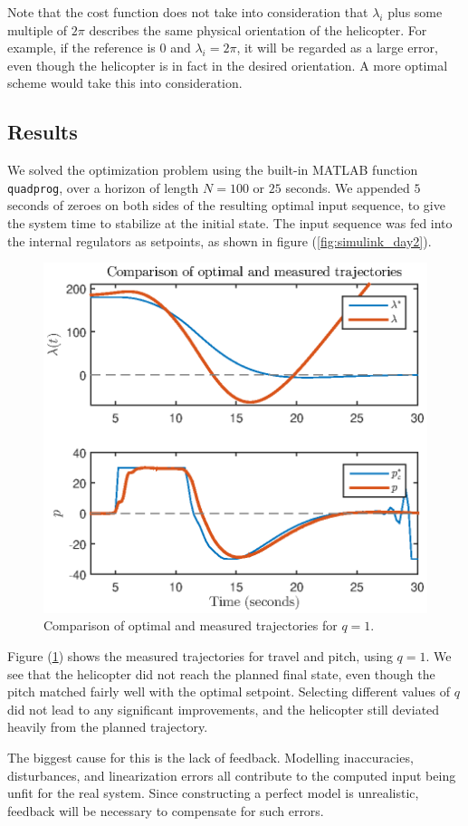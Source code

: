 Note that the cost function does not take into consideration that $\lambda_i$ plus some multiple of $2\pi$ describes the same physical orientation of the helicopter. For example, if the reference is $0$ and $\lambda_i = 2\pi$, it will be regarded as a large error, even though the helicopter is in fact in the desired orientation. A more optimal scheme would take this into consideration.

\subsection{Results}

We solved the optimization problem using the built-in MATLAB function \texttt{quadprog}, over a horizon of length $N=100$ or $25$ seconds. We appended $5$ seconds of zeroes on both sides of the resulting optimal input sequence, to give the system time to stabilize at the initial state. The input sequence was fed into the internal regulators as setpoints, as shown in figure (\ref{fig:simulink_day2}).

\begin{figure}[htb]
    \centering
    \includegraphics{figures/day2/plot_day2}
    \caption{Comparison of optimal and measured trajectories for $q = 1$.}
    \label{fig:day2_plot}
\end{figure}

Figure (\ref{fig:day2_plot}) shows the measured trajectories for travel and pitch, using $q = 1$. We see that the helicopter did not reach the planned final state, even though the pitch matched fairly well with the optimal setpoint. Selecting different values of $q$ did not lead to any significant improvements, and the helicopter still deviated heavily from the planned trajectory.

The biggest cause for this is the lack of feedback. Modelling inaccuracies, disturbances, and linearization errors all contribute to the computed input being unfit for the real system. Since constructing a perfect model is unrealistic, feedback will be necessary to compensate for such errors.
